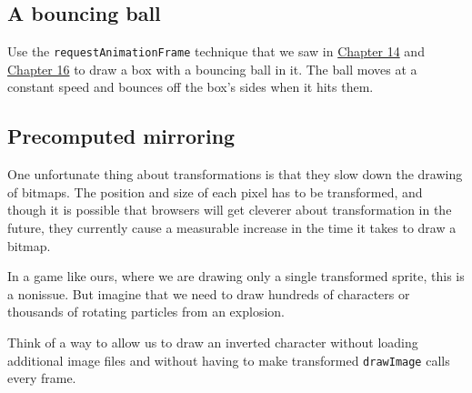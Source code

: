 \subsection{A bouncing ball}

Use the \lstinline`requestAnimationFrame` technique that we saw in \hyperref[dom.animationFrame]{Chapter 14} and \hyperref[game.runAnimation]{Chapter 16} to draw a box with a bouncing ball in it. The ball moves at a constant speed and bounces off the box's sides when it hits them.

\subsection{Precomputed mirroring}

One unfortunate thing about transformations is that they slow down the drawing of bitmaps. The position and size of each pixel has to be transformed, and though it is possible that browsers will get cleverer about transformation in the future, they currently cause a measurable increase in the time it takes to draw a bitmap.

In a game like ours, where we are drawing only a single transformed sprite, this is a nonissue. But imagine that we need to draw hundreds of characters or thousands of rotating particles from an explosion.

Think of a way to allow us to draw an inverted character without loading additional image files and without having to make transformed \lstinline`drawImage` calls every frame.
